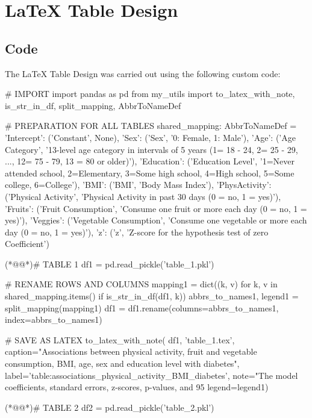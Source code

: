 \documentclass[11pt]{article}
\begin{document}
\section{LaTeX Table Design}
\subsection{{Code}}
The LaTeX Table Design was carried out using the following custom code:

\begin{python}

# IMPORT
import pandas as pd
from my_utils import to_latex_with_note, is_str_in_df, split_mapping, AbbrToNameDef

# PREPARATION FOR ALL TABLES
shared_mapping: AbbrToNameDef = {
    'Intercept': ('Constant', None),
    'Sex': ('Sex', '0: Female, 1: Male'),
    'Age': ('Age Category', '13-level age category in intervals of 5 years (1= 18 - 24, 2= 25 - 29, ..., 12= 75 - 79, 13 = 80 or older)'),
    'Education': ('Education Level', '1=Never attended school, 2=Elementary, 3=Some high school, 4=High school, 5=Some college, 6=College'),
    'BMI': ('BMI', 'Body Mass Index'),
    'PhysActivity': ('Physical Activity', 'Physical Activity in past 30 days (0 = no, 1 = yes)'),
    'Fruits': ('Fruit Consumption', 'Consume one fruit or more each day (0 = no, 1 = yes)'),
    'Veggies': ('Vegetable Consumption', 'Consume one vegetable or more each day (0 = no, 1 = yes)'),
    'z': ('z', 'Z-score for the hypothesis test of zero Coefficient')
}

(*@@*)# TABLE 1
df1 = pd.read_pickle('table_1.pkl')

# RENAME ROWS AND COLUMNS
mapping1 = dict((k, v) for k, v in shared_mapping.items() if is_str_in_df(df1, k)) 
abbrs_to_names1, legend1 = split_mapping(mapping1)
df1 = df1.rename(columns=abbrs_to_names1, index=abbrs_to_names1)

# SAVE AS LATEX
to_latex_with_note(
    df1, 'table_1.tex',
    caption="Associations between physical activity, fruit and vegetable consumption, BMI, age, sex and education level with diabetes", 
    label='table:associations_physical_activity_BMI_diabetes',
    note="The model coefficients, standard errors, z-scores, p-values, and 95%
    legend=legend1)


(*@@*)# TABLE 2
df2 = pd.read_pickle('table_2.pkl')


\end{python}
\end{document}
